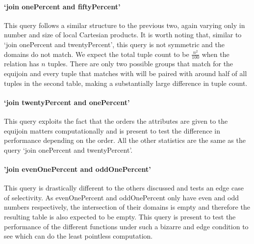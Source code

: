 \paragraph{`join onePercent and fiftyPercent'} This query follows a similar
structure to the previous two, again varying only in number and size of local
Cartesian products. It is worth noting that, similar to `join onePercent and
twentyPercent', this query is not symmetric and the domains do not match. We
expect the total tuple count to be $\frac{n^2}{100}$ when the
 relation has $n$ tuples. There are only two possible groups
that match for the equijoin and every tuple that matches with
 will be paired with around half of all tuples in
the second table, making a substantially large difference in tuple count.

\paragraph{`join twentyPercent and onePercent'} This query exploits the fact
that the orders the attributes are given to the equijoin matters computationally
and is present to test the difference in performance depending on the order. All
the other statistics are the same as the query `join onePercent and
twentyPercent'.

\paragraph{'join evenOnePercent and oddOnePercent'} This query is drastically
different to the others discussed and tests an edge case of selectivity. As
evenOnePercent and oddOnePercent only have even and odd numbers respectively,
the intersection of their domains is empty and therefore the resulting table is
also expected to be empty. This query is present to test the performance of the
different functions under such a bizarre and edge condition to see which can do
the least pointless computation.

